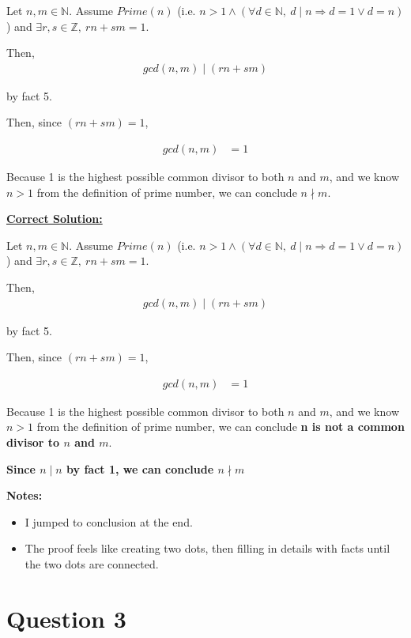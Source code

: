 \documentclass[12pt]{article}
\begin{document}
\begin{enumerate}[a.]
    Let $n,m \in \mathbb{N}$. Assume $Prime(n)$ (i.e. $n > 1 \land (\forall d \in \mathbb{N},\:
    d \mid n \Rightarrow d = 1 \lor d = n)$) and $\exists r,s \in \mathbb{Z},\:
    rn + sm = 1$.

    \bigskip

    Then,
    \setcounter{equation}{0}
    \begin{align}
        gcd(n,m) \mid (rn + sm)
    \end{align}

    by fact 5.

    \bigskip

    Then, since $(rn + sm) = 1$,

    \begin{align}
        gcd(n,m) &= 1
    \end{align}

    \bigskip

    Because 1 is the highest possible common divisor to both $n$ and $m$, and
    we know $n > 1$ from the definition of prime number, we can conclude
    $n \nmid m$.

    \begin{mdframed}

        \underline{\textbf{Correct Solution:}}

        Let $n,m \in \mathbb{N}$. Assume $Prime(n)$ (i.e. $n > 1 \land (\forall d \in \mathbb{N},\:
        d \mid n \Rightarrow d = 1 \lor d = n)$) and $\exists r,s \in \mathbb{Z},\:
        rn + sm = 1$.

        \bigskip

        Then,
        \setcounter{equation}{0}
        \begin{align}
            gcd(n,m) \mid (rn + sm)
        \end{align}

        by fact 5.

        \bigskip

        Then, since $(rn + sm) = 1$,

        \begin{align}
            gcd(n,m) &= 1
        \end{align}

        \bigskip

        Because 1 is the highest possible common divisor to both $n$ and $m$, and
        we know $n > 1$ from the definition of prime number, we can conclude
        \textbf{n is not a common divisor to $n$ and $m$}.

        \textbf{Since $n \mid n$ by fact 1, we can conclude $n \nmid m$ }
    \end{mdframed}

    \textbf{Notes:}
    \begin{itemize}
        \item I jumped to conclusion at the end.
        \item The proof feels like creating two dots, then filling in details with facts
        until the two dots are connected.
    \end{itemize}


\end{enumerate}

\section*{Question 3}
\end{document}
